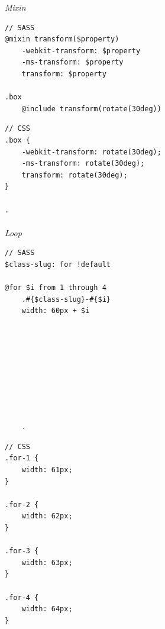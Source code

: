\begin{multicols}{2}
    \columnbreak
\end{multicols}
\textit{Mixin}
\begin{multicols}{2}
    \begin{lstlisting}
// SASS
@mixin transform($property) 
    -webkit-transform: $property
    -ms-transform: $property
    transform: $property

.box
    @include transform(rotate(30deg))   
    \end{lstlisting}
    \columnbreak
    \begin{lstlisting}
// CSS
.box {
    -webkit-transform: rotate(30deg);
    -ms-transform: rotate(30deg);
    transform: rotate(30deg);
}

.
    \end{lstlisting}
\end{multicols}


\paragraph{}
\paragraph{}
\paragraph{}

\textit{Loop}


\begin{multicols}{2}
    \begin{lstlisting}
// SASS
$class-slug: for !default

@for $i from 1 through 4
    .#{$class-slug}-#{$i}
    width: 60px + $i









    .
    \end{lstlisting}

    \columnbreak
    \begin{lstlisting}
// CSS
.for-1 {
    width: 61px;
}

.for-2 {
    width: 62px;
}

.for-3 {
    width: 63px;
}

.for-4 {
    width: 64px;
}
    \end{lstlisting}   
\end{multicols}
   

